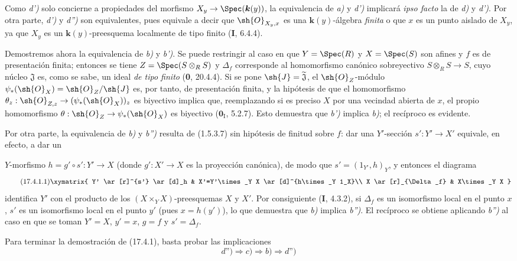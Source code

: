 Como \emph{d')} solo concierne a propiedades del morfismo $X_y\to\Spec(\boldsymbol{k}(y))$, la equivalencia de \emph{a)} y \emph{d')} implicará \emph{ipso facto} la de \emph{d)} y \emph{d')}. Por otra parte, \emph{d')} y \emph{d'')} son equivalentes, pues equivale a decir que $\sh{O}_{X_y,x}$ es una $\boldsymbol{k}(y)$-álgebra \emph{finita} o que $x$ es un punto aislado de $X_y$, ya que $X_y$ es un $\boldsymbol{k}(y)$-preesquema localmente de tipo finito (\textbf I, 6.4.4).

Demostremos ahora la equivalencia de \emph{b)} y \emph{b')}. Se puede restringir al caso en que $Y=\Spec(R)$ y $X=\Spec(S)$ son afines y $f$ es de presentación finita; entonces se tiene $Z=\Spec(S\otimes_R S)$ y $\Delta_f$ corresponde al homomorfismo canónico sobreyectivo $S\otimes_R S\to S$, cuyo núcleo $\mathfrak{J}$ es, como se sabe, un ideal \emph{de tipo finito} (\textbf 0, 20.4.4). Si se pone $\sh{J}=\widetilde{\mathfrak{J}}$, el $\sh{O}_Z$-módulo $\psi_*(\sh{O}_X)=\sh{O}_Z/\sh{J}$ es, por tanto, de presentación finita, y la hipótesis de que el homomorfismo $\theta_z: \sh{O}_{Z,z}\to(\psi_*(\sh{O}_X))_z$ es biyectivo implica que, reemplazando si es preciso $X$ por una vecindad abierta de $x$, el propio homomorfismo $\theta:\sh{O}_Z\to\psi_*(\sh{O}_X)$ es biyectivo ($\mathbf{0}_{\mathrm I}$, 5.2.7). Esto demuestra que \emph{b')} implica \emph{b)}; el recíproco es evidente.

Por otra parte, la equivalencia de \emph{b)} y \emph{b'')} resulta de (1.5.3.7) sin hipótesis de finitud sobre $f$: dar una $Y'$-sección $s':Y'\to X'$ equivale, en efecto, a dar un

$Y$-morfismo $h=g'\circ s':Y'\to X$ (donde $g':X'\to X$ es la proyección canónica), de modo que $s'=(1_{Y'},h)_Y$, y entonces el diagrama
\[
\tag{17.4.1.1}
\label{IV.17.4.1.1}
\xymatrix{
Y' \ar[r]^{s'} \ar[d]_h & X'=Y'\times_Y X \ar[d]^{h\times_Y 1_X}\\
X \ar[r]_{\Delta_f} & X\times_Y X
}
\]
identifica $Y'$ con el producto de los $(X\times_Y X)$-preesquemas $X$ y $X'$. Por consiguiente (\textbf I, 4.3.2), si $\Delta_f$ es un isomorfismo local en el punto $x$, $s'$ es un isomorfismo local en el punto $y'$ (pues $x=h(y')$), lo que demuestra que \emph{b)} implica \emph{b'')}. El recíproco se obtiene aplicando \emph{b'')} al caso en que se toman $Y'=X$, $y'=x$, $g=f$ y $s'=\Delta_f$.

Para terminar la demostración de (17.4.1), basta probar las implicaciones
\[
\textit{d'')}\Rightarrow\textit{c)}\Rightarrow\textit{b)}\Rightarrow\textit{d'')}
\]

